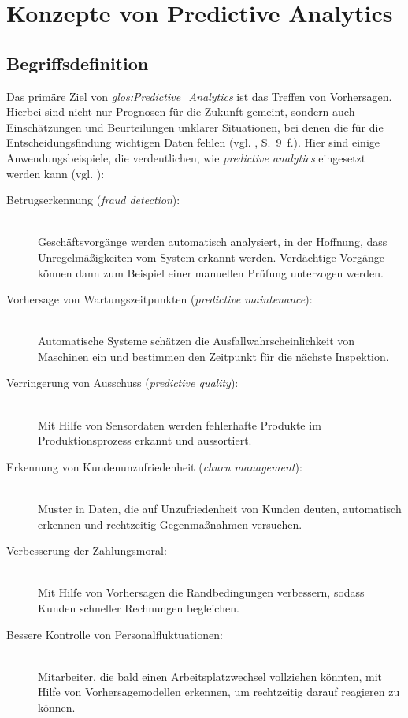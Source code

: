 \chapter{Konzepte von Predictive Analytics}
\label{part:Konzepte_PA}

\section{Begriffsdefinition}

Das primäre Ziel von \emph{\gls{glos:Predictive_Analytics}} ist das Treffen von
Vorhersagen.
Hierbei sind nicht nur Prognosen für die Zukunft gemeint, sondern
auch Einschätzungen und Beurteilungen unklarer Situationen, bei denen die für
die Entscheidungsfindung wichtigen Daten fehlen (vgl. \cite{Dinov}, S.~9~f.).
Hier sind einige Anwendungsbeispiele, die verdeutlichen, wie \emph{predictive
analytics} eingesetzt werden kann (vgl. \cite{Schmitz}):

\begin{description}

\item[Betrugserkennung (\emph{fraud detection}):] \hfill \\
Geschäftsvorgänge werden automatisch analysiert, in der Hoffnung, dass
Unregelmäßigkeiten vom System erkannt werden. Verdächtige Vorgänge können dann
zum Beispiel einer manuellen Prüfung unterzogen werden.

\item[Vorhersage von Wartungszeitpunkten (\emph{predictive
  maintenance}):] \hfill \\
Automatische Systeme schätzen die Ausfallwahrscheinlichkeit von Maschinen ein
und bestimmen den Zeitpunkt für die nächste Inspektion.

\item[Verringerung von Ausschuss (\emph{predictive quality}):] \hfill \\
Mit Hilfe von Sensordaten werden fehlerhafte Produkte im Produktionsprozess
erkannt und aussortiert.

\item[Erkennung von Kundenunzufriedenheit (\emph{churn management}):] \hfill \\
Muster in Daten, die auf Unzufriedenheit von Kunden deuten, automatisch erkennen
und rechtzeitig Gegenmaßnahmen versuchen.

\item[Verbesserung der Zahlungsmoral:] \hfill \\
Mit Hilfe von Vorhersagen die Randbedingungen verbessern, sodass Kunden
schneller Rechnungen begleichen.

\item[Bessere Kontrolle von Personalfluktuationen:] \hfill \\
Mitarbeiter, die bald einen Arbeitsplatzwechsel vollziehen könnten, mit Hilfe
von Vorhersagemodellen erkennen, um rechtzeitig darauf reagieren zu können.

\end{description}

